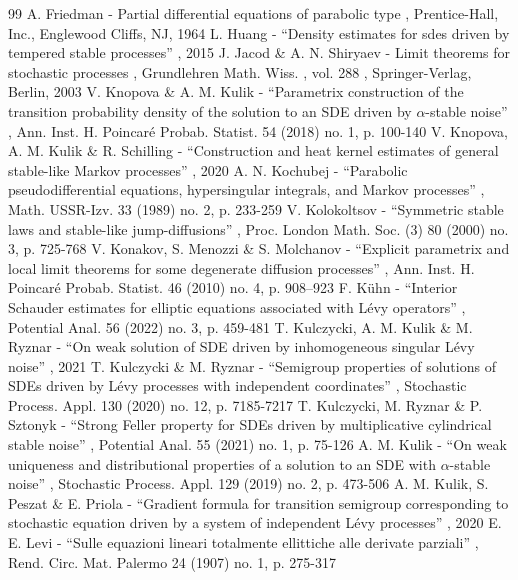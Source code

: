 \documentclass[11pt]{article}
\numberwithin{equation}{section}\providecommand{\asymp}{\mathrel{\sim}}
\theoremstyle{plain}
\theoremstyle{definition}
\newcommand\1{{\mathbf{1}}}
\begin{document}
\begin{thebibliography}{99}
 A. Friedman - Partial differential equations of parabolic type , Prentice-Hall, Inc., Englewood Cliffs, NJ, 1964
 L. Huang - “Density estimates for sdes driven by tempered stable processes” , 2015
 J. Jacod \& A. N. Shiryaev - Limit theorems for stochastic processes , Grundlehren Math. Wiss. , vol. 288 , Springer-Verlag, Berlin, 2003
 V. Knopova \& A. M. Kulik - “Parametrix construction of the transition probability density of the solution to an SDE driven by $\alpha $-stable noise” , Ann. Inst. H. Poincaré Probab. Statist. 54 (2018) no. 1, p. 100-140
 V. Knopova, A. M. Kulik \& R. Schilling - “Construction and heat kernel estimates of general stable-like Markov processes” , 2020
 A. N. Kochubej - “Parabolic pseudodifferential equations, hypersingular integrals, and Markov processes” , Math. USSR-Izv. 33 (1989) no. 2, p. 233-259
 V. Kolokoltsov - “Symmetric stable laws and stable-like jump-diffusions” , Proc. London Math. Soc. (3) 80 (2000) no. 3, p. 725-768
 V. Konakov, S. Menozzi \& S. Molchanov - “Explicit parametrix and local limit theorems for some degenerate diffusion processes” , Ann. Inst. H. Poincaré Probab. Statist. 46 (2010) no. 4, p. 908--923
 F. Kühn - “Interior Schauder estimates for elliptic equations associated with Lévy operators” , Potential Anal. 56 (2022) no. 3, p. 459-481
 T. Kulczycki, A. M. Kulik \& M. Ryznar - “On weak solution of SDE driven by inhomogeneous singular Lévy noise” , 2021
 T. Kulczycki \& M. Ryznar - “Semigroup properties of solutions of SDEs driven by Lévy processes with independent coordinates” , Stochastic Process. Appl. 130 (2020) no. 12, p. 7185-7217
 T. Kulczycki, M. Ryznar \& P. Sztonyk - “Strong Feller property for SDEs driven by multiplicative cylindrical stable noise” , Potential Anal. 55 (2021) no. 1, p. 75-126
 A. M. Kulik - “On weak uniqueness and distributional properties of a solution to an SDE with $\alpha $-stable noise” , Stochastic Process. Appl. 129 (2019) no. 2, p. 473-506
 A. M. Kulik, S. Peszat \& E. Priola - “Gradient formula for transition semigroup corresponding to stochastic equation driven by a system of independent Lévy processes” , 2020
 E. E. Levi - “Sulle equazioni lineari totalmente ellittiche alle derivate parziali” , Rend. Circ. Mat. Palermo 24 (1907) no. 1, p. 275-317

\end{thebibliography}
\end{document}
